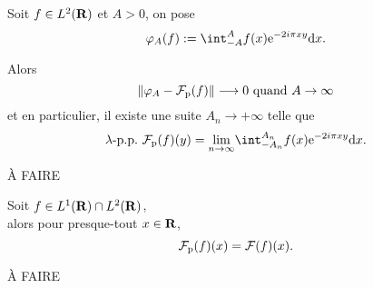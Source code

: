\documentclass[a4paper,11pt, twoside]{article}
\begin{document}
\begin{prop}
  Soit $f\in L^2(\mathbf R)$ et $A>0$, on pose 
  $$\varphi_A(f):=\int_{-A}^Af(x)\ex{-2i\pi xy}\dx.$$

  Alors 
  $$\left\lVert\varphi_A-\mathcal F_\text{p}(f)\right\rVert\longrightarrow 0\text{ quand }A\to\infty$$
  et en particulier, il existe une suite $A_n\longrightarrow +\infty$ telle que 
  $$\lambda\text{-p.p.}\ \F_\text{p}(f)(y)=\Lim\int_{-A_n}^{A_n}f(x)\ex{-2i\pi xy}\dx.$$
\end{prop}

\begin{Proof}
  À FAIRE
\end{Proof}


\begin{prop}
  Soit $f\in L^1(\mathbf R)\cap L^2(\mathbf R)$,\\

  alors pour presque-tout $x\in\mathbf R$,
  $$\mathcal F_\text{p}(f)(x)=\mathcal F(f)(x).$$
\end{prop}

\begin{Proof}
  À FAIRE
\end{Proof}
\end{document}
